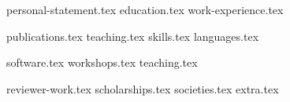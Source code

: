 \documentclass[letterpaper,11pt]{article}
\begin{document}



{personal-statement.tex}
{education.tex}
{work-experience.tex}

\pagebreak

{publications.tex}
{teaching.tex}
\sidebyside
    {{skills.tex}}
    {{languages.tex}}

\pagebreak

{software.tex}
{workshops.tex}
{teaching.tex}

\pagebreak

{reviewer-work.tex}
{scholarships.tex}
{societies.tex}
{extra.tex}
\end{document}
